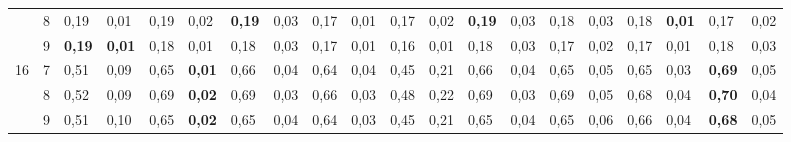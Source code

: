 \documentclass[conference]{IEEEtran}
\begin{document}
\begin{table}[]
\begin{tabular}{|cl|ll|ll|ll|ll|ll|ll|ll|ll|ll|}
		\multicolumn{1}{|c|}{}                    & 8 & \multicolumn{1}{l|}{0,19}          & 0,01          & \multicolumn{1}{l|}{0,19}          & 0,02          & \multicolumn{1}{l|}{\textbf{0,19}} & 0,03          & \multicolumn{1}{l|}{0,17} & 0,01          & \multicolumn{1}{l|}{0,17}                 & 0,02          & \multicolumn{1}{l|}{\textbf{0,19}} & 0,03          & \multicolumn{1}{l|}{0,18}          & 0,03          & \multicolumn{1}{l|}{0,18}          & \textbf{0,01} & \multicolumn{1}{l|}{0,17}          & 0,02          \\ \cline{2-20} 
		\multicolumn{1}{|c|}{}                    & 9 & \multicolumn{1}{l|}{\textbf{0,19}} & \textbf{0,01} & \multicolumn{1}{l|}{0,18}          & 0,01          & \multicolumn{1}{l|}{0,18}          & 0,03          & \multicolumn{1}{l|}{0,17} & 0,01          & \multicolumn{1}{l|}{0,16}                 & 0,01          & \multicolumn{1}{l|}{0,18}          & 0,03          & \multicolumn{1}{l|}{0,17}          & 0,02          & \multicolumn{1}{l|}{0,17}          & 0,01          & \multicolumn{1}{l|}{0,18}          & 0,03          \\ \hline
		\multicolumn{1}{|c|}{\multirow{3}{*}{16}} & 7 & \multicolumn{1}{l|}{0,51}          & 0,09          & \multicolumn{1}{l|}{0,65}          & \textbf{0,01} & \multicolumn{1}{l|}{0,66}          & 0,04          & \multicolumn{1}{l|}{0,64} & 0,04          & \multicolumn{1}{l|}{0,45}                 & 0,21          & \multicolumn{1}{l|}{0,66}          & 0,04          & \multicolumn{1}{l|}{0,65}          & 0,05          & \multicolumn{1}{l|}{0,65}          & 0,03          & \multicolumn{1}{l|}{\textbf{0,69}} & 0,05          \\ \cline{2-20} 
		\multicolumn{1}{|c|}{}                    & 8 & \multicolumn{1}{l|}{0,52}          & 0,09          & \multicolumn{1}{l|}{0,69}          & \textbf{0,02} & \multicolumn{1}{l|}{0,69}          & 0,03          & \multicolumn{1}{l|}{0,66} & 0,03          & \multicolumn{1}{l|}{0,48}                 & 0,22          & \multicolumn{1}{l|}{0,69}          & 0,03          & \multicolumn{1}{l|}{0,69}          & 0,05          & \multicolumn{1}{l|}{0,68}          & 0,04          & \multicolumn{1}{l|}{\textbf{0,70}} & 0,04          \\ \cline{2-20} 
		\multicolumn{1}{|c|}{}                    & 9 & \multicolumn{1}{l|}{0,51}          & 0,10          & \multicolumn{1}{l|}{0,65}          & \textbf{0,02} & \multicolumn{1}{l|}{0,65}          & 0,04          & \multicolumn{1}{l|}{0,64} & 0,03          & \multicolumn{1}{l|}{0,45}                 & 0,21          & \multicolumn{1}{l|}{0,65}          & 0,04          & \multicolumn{1}{l|}{0,65}          & 0,06          & \multicolumn{1}{l|}{0,66}          & 0,04          & \multicolumn{1}{l|}{\textbf{0,68}} & 0,05          \\ \hline

\end{tabular}
\end{table}
\end{document}
